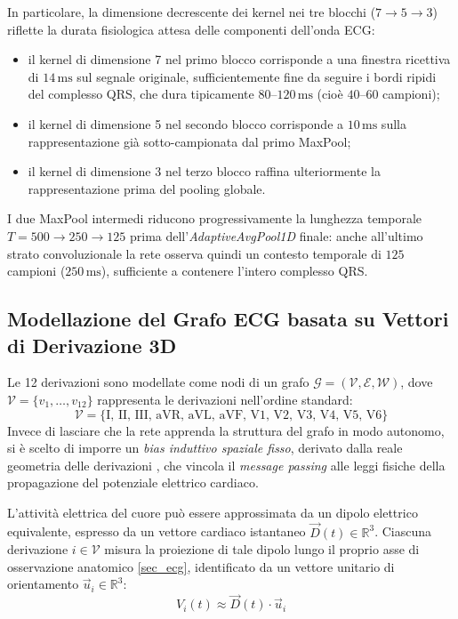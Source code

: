 In particolare, la dimensione decrescente dei kernel nei tre blocchi ($7\to5\to3$) riflette la durata fisiologica attesa delle componenti dell'onda ECG:
\begin{itemize}
	\item il kernel di dimensione 7 nel primo blocco corrisponde a una finestra ricettiva di $14\,\text{ms}$ sul segnale originale, sufficientemente fine da seguire i bordi ripidi del complesso QRS, che dura tipicamente $80$--$120\,\text{ms}$ (cioè $40$--$60$ campioni);
	\item il kernel di dimensione 5 nel secondo blocco corrisponde a $10\,\text{ms}$ sulla rappresentazione già sotto-campionata dal primo MaxPool;
	\item il kernel di dimensione 3 nel terzo blocco raffina ulteriormente la rappresentazione prima del pooling globale.
\end{itemize}
I due MaxPool intermedi riducono progressivamente la lunghezza temporale $T=500\to250\to125$ prima dell'\textit{AdaptiveAvgPool1D} finale: anche all'ultimo strato convoluzionale la rete osserva quindi un contesto temporale di $125$ campioni ($250\,\text{ms}$), sufficiente a contenere l'intero complesso QRS.

\subsection{Modellazione del Grafo ECG basata su Vettori di Derivazione 3D}
\label{sec:matrice_geometrica_3d}

Le 12 derivazioni sono modellate come nodi di un grafo $\mathcal{G} = (\mathcal{V}, \mathcal{E}, \mathcal{W})$, dove $\mathcal{V} = \{v_1, \dots, v_{12}\}$ rappresenta le derivazioni nell'ordine standard:
\begin{equation}
	\mathcal{V} = \{\text{I, II, III, aVR, aVL, aVF, V1, V2, V3, V4, V5, V6}\}
\end{equation}
Invece di lasciare che la rete apprenda la struttura del grafo in modo autonomo, si è scelto di imporre un \emph{bias induttivo spaziale fisso}, derivato dalla reale geometria delle derivazioni \cite{malmivuo1995bioelectromagnetism,goldberger2017ecg}, che vincola il \textit{message passing} alle leggi fisiche della propagazione del potenziale elettrico cardiaco.

L'attività elettrica del cuore può essere approssimata da un dipolo elettrico equivalente, espresso da un vettore cardiaco istantaneo $\vec{D}(t) \in \mathbb{R}^3$. Ciascuna derivazione $i \in \mathcal{V}$ misura la proiezione di tale dipolo lungo il proprio asse di osservazione anatomico \ref{sec_ecg}, identificato da un vettore unitario di orientamento $\vec{u}_i \in \mathbb{R}^3$:
\begin{equation}
	V_i(t) \approx \vec{D}(t) \cdot \vec{u}_i
\end{equation}

